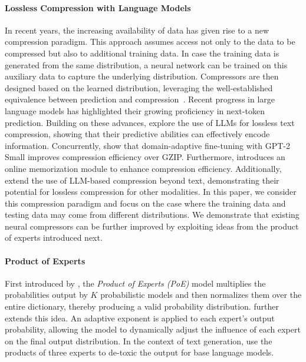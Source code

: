 \documentclass[11pt]{article}
\begin{document}
\paragraph{Lossless Compression with Language Models}
In recent years, the increasing availability of data has given rise to a new compression paradigm. This approach assumes access not only to the data to be compressed but also to additional training data. In case the training data is generated from the same distribution, a neural network can be trained on this auxiliary data to capture the underlying distribution. Compressors are then designed based on the learned distribution, leveraging the well-established equivalence between prediction and compression~\citep{schmidhuber1994predictive, schmidhuber1996sequential, mahoney2000fast, mikolov2012statistical, knoll2014cmix, cox2016syntactically, goyal2019deepzip, liu2019decmac, lmic, llmzip}.
Recent progress in large language models \cite{llama3, gpt4} has highlighted their growing proficiency in next-token prediction. 
Building on these advances, \citet{llmzip} explore the use of LLMs for lossless text compression, showing that their predictive abilities can effectively encode information. Concurrently, \citet{narashiman2024alphazip} show that domain-adaptive fine-tuning with GPT-2 Small improves compression efficiency over GZIP. Furthermore, \citet{mittu2024finezip} introduces an online memorization module to enhance compression efficiency.
Additionally, \citet{lmic} extend the use of LLM-based compression beyond text, demonstrating their potential for lossless compression for other modalities. In this paper, we consider this compression paradigm and focus on the case where the training data and testing data may come from different distributions. We demonstrate that existing neural compressors can be further improved by exploiting ideas from the product of experts introduced next. 


\paragraph{Product of Experts} First introduced by \citet{PoE}, the \textit{Product of Experts (PoE)} model multiplies the probabilities output by \(K\) probabilistic models and then normalizes them over the entire dictionary, thereby producing a valid probability distribution.
\citet{gPoE} further extends this idea. An adaptive exponent is applied to each expert’s output probability, allowing the model to dynamically adjust the influence of each expert on the final output distribution.
In the context of text generation,  \citet{liu2021dexperts,hallinan2023steer} use the products of three experts to de-toxic the output for base language models. 
\end{document}

